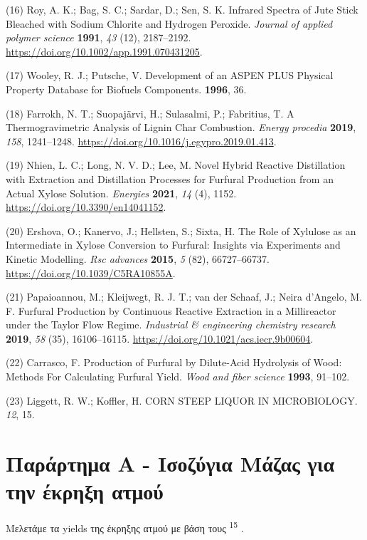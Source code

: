 \documentclass[11pt]{article}
\makeatletter
\newcommand{\citeprocitem}[2]{\hyper@linkstart{cite}{citeproc_bib_item_#1}#2\hyper@linkend}
\makeatother
\begin{document}
\hypertarget{citeproc_bib_item_16}{(16) Roy, A. K.; Bag, S. C.; Sardar, D.; Sen, S. K. Infrared Spectra of Jute Stick Bleached with Sodium Chlorite and Hydrogen Peroxide. \textit{Journal of applied polymer science} \textbf{1991}, \textit{43} (12), 2187–2192. \url{https://doi.org/10.1002/app.1991.070431205}.}

\hypertarget{citeproc_bib_item_17}{(17) Wooley, R. J.; Putsche, V. Development of an ASPEN PLUS Physical Property Database for Biofuels Components. \textbf{1996}, 36.}

\hypertarget{citeproc_bib_item_18}{(18) Farrokh, N. T.; Suopajärvi, H.; Sulasalmi, P.; Fabritius, T. A Thermogravimetric Analysis of Lignin Char Combustion. \textit{Energy procedia} \textbf{2019}, \textit{158}, 1241–1248. \url{https://doi.org/10.1016/j.egypro.2019.01.413}.}

\hypertarget{citeproc_bib_item_19}{(19) Nhien, L. C.; Long, N. V. D.; Lee, M. Novel Hybrid Reactive Distillation with Extraction and Distillation Processes for Furfural Production from an Actual Xylose Solution. \textit{Energies} \textbf{2021}, \textit{14} (4), 1152. \url{https://doi.org/10.3390/en14041152}.}

\hypertarget{citeproc_bib_item_20}{(20) Ershova, O.; Kanervo, J.; Hellsten, S.; Sixta, H. The Role of Xylulose as an Intermediate in Xylose Conversion to Furfural: Insights via Experiments and Kinetic Modelling. \textit{Rsc advances} \textbf{2015}, \textit{5} (82), 66727–66737. \url{https://doi.org/10.1039/C5RA10855A}.}

\hypertarget{citeproc_bib_item_21}{(21) Papaioannou, M.; Kleijwegt, R. J. T.; van der Schaaf, J.; Neira d’Angelo, M. F. Furfural Production by Continuous Reactive Extraction in a Millireactor under the Taylor Flow Regime. \textit{Industrial \& engineering chemistry research} \textbf{2019}, \textit{58} (35), 16106–16115. \url{https://doi.org/10.1021/acs.iecr.9b00604}.}

\hypertarget{citeproc_bib_item_22}{(22) Carrasco, F. Production of Furfural by Dilute-Acid Hydrolysis of Wood: Methods For Calculating Furfural Yield. \textit{Wood and fiber science} \textbf{1993}, 91–102.}

\hypertarget{citeproc_bib_item_23}{(23) Liggett, R. W.; Koffler, H. CORN STEEP LIQUOR IN MICROBIOLOGY. \textit{12}, 15.}

\pagebreak

\section{Παράρτημα Α - Ισοζύγια Μάζας για την έκρηξη ατμού}
\label{sec:orgb07b7b4}
Μελετάμε τα yields της έκρηξης ατμού με βάση τους \textsuperscript{\citeprocitem{15}{15}} .
\end{document}

